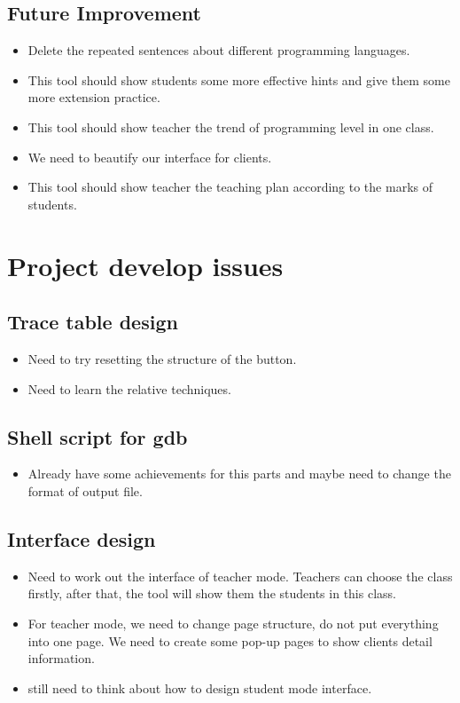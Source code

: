\documentclass[11pt, a4paper]{article}
\begin{document}
\subsection{Future Improvement}
\begin{itemize}
\item Delete the repeated sentences about different programming languages.
\item This tool should show students some more effective hints and give them some more extension practice.
\item This tool should show teacher the trend of programming level in one class.
\item We need to beautify our interface for clients.
\item This tool should show teacher the teaching plan according to the marks of students.
\end{itemize}


\section{Project develop issues}
\subsection{Trace table design}
\begin{itemize}
\item Need to try resetting the structure of the button.
\item Need to learn the relative techniques.
\end{itemize}

\subsection{Shell script for gdb}
\begin{itemize}
\item Already have some achievements for this parts and maybe need to change the format of output file.
\end{itemize}

\subsection{Interface design}
\begin{itemize}
\item Need to work out the interface of teacher mode. Teachers can choose the class firstly, after that, the tool will show them the students in this class.
\item For teacher mode, we need to change page structure, do not put everything into one page. We need to create some pop-up pages to show clients detail information.
\item still need to think about how to design student mode interface.
\end{itemize}
\end{document}
